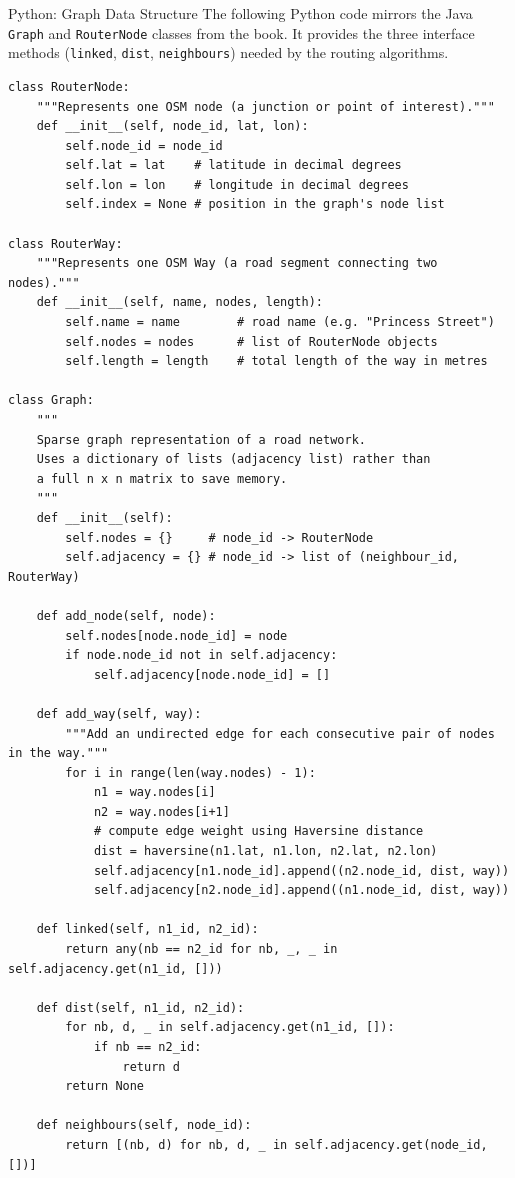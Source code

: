 \documentclass[aspectratio=169,10pt]{beamer}
\begin{document}
\begin{frame}[fragile]{Python: Graph Data Structure}
  The following Python code mirrors the Java \texttt{Graph} and
  \texttt{RouterNode} classes from the book.  It provides the three
  interface methods (\texttt{linked}, \texttt{dist}, \texttt{neighbours})
  needed by the routing algorithms.

\begin{lstlisting}[style=pythoncode]
class RouterNode:
    """Represents one OSM node (a junction or point of interest)."""
    def __init__(self, node_id, lat, lon):
        self.node_id = node_id
        self.lat = lat    # latitude in decimal degrees
        self.lon = lon    # longitude in decimal degrees
        self.index = None # position in the graph's node list

class RouterWay:
    """Represents one OSM Way (a road segment connecting two nodes)."""
    def __init__(self, name, nodes, length):
        self.name = name        # road name (e.g. "Princess Street")
        self.nodes = nodes      # list of RouterNode objects
        self.length = length    # total length of the way in metres

class Graph:
    """
    Sparse graph representation of a road network.
    Uses a dictionary of lists (adjacency list) rather than
    a full n x n matrix to save memory.
    """
    def __init__(self):
        self.nodes = {}     # node_id -> RouterNode
        self.adjacency = {} # node_id -> list of (neighbour_id, RouterWay)

    def add_node(self, node):
        self.nodes[node.node_id] = node
        if node.node_id not in self.adjacency:
            self.adjacency[node.node_id] = []

    def add_way(self, way):
        """Add an undirected edge for each consecutive pair of nodes in the way."""
        for i in range(len(way.nodes) - 1):
            n1 = way.nodes[i]
            n2 = way.nodes[i+1]
            # compute edge weight using Haversine distance
            dist = haversine(n1.lat, n1.lon, n2.lat, n2.lon)
            self.adjacency[n1.node_id].append((n2.node_id, dist, way))
            self.adjacency[n2.node_id].append((n1.node_id, dist, way))

    def linked(self, n1_id, n2_id):
        return any(nb == n2_id for nb, _, _ in self.adjacency.get(n1_id, []))

    def dist(self, n1_id, n2_id):
        for nb, d, _ in self.adjacency.get(n1_id, []):
            if nb == n2_id:
                return d
        return None

    def neighbours(self, node_id):
        return [(nb, d) for nb, d, _ in self.adjacency.get(node_id, [])]
\end{lstlisting}
\end{frame}
\end{document}
